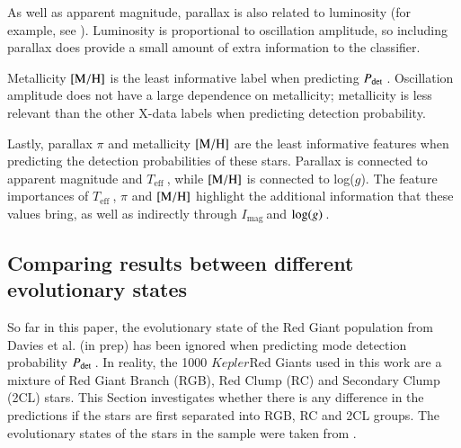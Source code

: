 \documentclass[a4paper,fleqn,usenatbib,useAMS]{mnras}
\newcommand{\teff}{\ensuremath{T_{\textrm{eff}}\:}}
\newcommand{\kep}{\ensuremath{Kepler}\:}
\newcommand{\pdet}{\ensuremath{P_{\rm det}\:}}
\newcommand{\imag}{\ensuremath{I_{\textrm{mag}}\:}}
\newcommand{\logg}{\ensuremath{{\rm log}(g)\:}}
\begin{document}
As well as apparent magnitude, parallax is also related to luminosity (for example, see \citet{torres_accurate_2010}). Luminosity is proportional to oscillation amplitude, so including parallax does provide a small amount of extra information to the classifier.

Metallicity $\rm [M/H]$ is the least informative label when predicting \pdet. Oscillation amplitude does not have a large dependence on metallicity; metallicity is less relevant than the other X-data labels when predicting detection probability.


Lastly, parallax $\pi$ and metallicity $\rm [M/H]$ are the least informative features when predicting the detection probabilities of these stars. Parallax is connected to apparent magnitude and \teff, while $\rm [M/H]$ is connected to log($g$). The feature importances of \teff, $\pi$ and $\rm [M/H]$ highlight the additional information that these values bring, as well as indirectly through \imag and \logg.




 

\subsection{Comparing results between different evolutionary states}
\label{sect: evo states}

So far in this paper, the evolutionary state of the Red Giant population from Davies et al. (in prep) has been ignored when predicting mode detection probability \pdet. In reality, the 1000 \kep Red Giants used in this work are a mixture of Red Giant Branch (RGB), Red Clump (RC) and Secondary Clump (2CL) stars. This Section investigates whether there is any difference in the predictions if the stars are first separated into RGB, RC and 2CL groups. The evolutionary states of the stars in the sample were taken from \citet{elsworth_new_2017}. 
\end{document}
